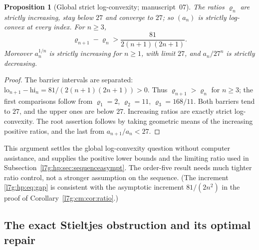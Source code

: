 \documentclass[11pt,letterpaper]{article}
\newtheorem{proposition}[theorem]{Proposition}
\theoremstyle{remark}\newtheorem{remark}[theorem]{Remark}
\newcounter{l7gtrsavedeq}
\begin{document}
\begin{proposition}[Global strict log-convexity; manuscript~07]\label{l7g:hp:prop:logconvex}
The ratios $\varrho_n$ are strictly increasing, stay below $27$ and
converge to $27$; so $(a_n)$ is strictly log-convex at every index. For
$n\ge3$,
\begin{equation}\label{l7g:hp:eq:gap}
 \varrho_{n+1}-\varrho_n>\frac{81}{2(n+1)(2n+1)}.
\end{equation}
Moreover $a_n^{1/n}$ is strictly increasing for $n\ge1$, with limit $27$,
and $a_n/27^n$ is strictly decreasing.
\end{proposition}
\begin{proof}
The barrier intervals are separated:
$\mathrm{lo}_{n+1}-\mathrm{hi}_n=81/(2(n+1)(2n+1))>0$. Thus
$\varrho_{n+1}>\varrho_n$ for $n\ge3$; the first comparisons follow from
$\varrho_1=2$, $\varrho_2=11$, $\varrho_3=168/11$. Both barriers tend to
$27$, and the upper ones are below $27$. Increasing ratios are exactly
strict log-convexity. The root assertion follows by taking geometric means
of the increasing positive ratios, and the last from $a_{n+1}/a_n<27$.
\end{proof}
This argument settles the global log-convexity question without computer
assistance, and supplies the positive lower bounds and the limiting ratio
used in Subsection~\ref{l7g:hp:sec:sequenceasympt}. The order-five result
needs much tighter ratio control, not a stronger assumption on the
sequence. (The increment \eqref{l7g:hp:eq:gap} is consistent with the
asymptotic increment $81/(2n^2)$ in the proof of
Corollary~\ref{l7g:cm:cor:ratio}.)

\subsection{The exact Stieltjes obstruction and its optimal repair}\label{l7g:hp:sec:moments}
\end{document}
